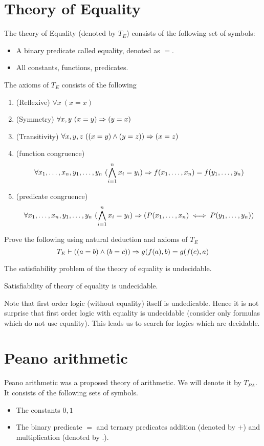 \section{Theory of Equality}
The theory of Equality (denoted by $T_E$) consists of the following set of symbols:
\begin{itemize}
\item A binary predicate called equality, denoted as $=$.
\item All constants, functions, predicates.
\end{itemize}
The axioms of $T_E$ consists of the following
\begin{enumerate}
\item (Reflexive) $\forall x ~(x=x)$
\item (Symmetry) $\forall x,y ~(x=y) \Rightarrow (y=x)$
\item (Transitivity) $\forall x,y,z ~((x=y)\wedge (y=z)) \Rightarrow (x=z)$
\item (function congruence) 
\[\forall x_1,\dots,x_n, y_1,\dots, y_n ~(\bigwedge_{i=1}^n x_i = y_i) \Rightarrow f(x_1,\dots,x_n) = f(y_1,\dots,y_n)\]
\item (predicate congruence) 
\[\forall x_1,\dots,x_n, y_1,\dots, y_n ~(\bigwedge_{i=1}^n x_i = y_i) \Rightarrow (P(x_1,\dots,x_n) \iff P(y_1,\dots,y_n))\]
\end{enumerate}

\begin{exercise}
Prove the following using natural deduction and axioms of $T_E$
\[
T_E \vdash ((a=b) \wedge (b=c)) \Rightarrow g(f(a),b) = g(f(c),a)
\]
\end{exercise}

The satisfiability problem of the theory of equality is undecidable.
\begin{theorem}
Satisfiability of theory of equality is undecidable.
\end{theorem}
Note that first order logic (without equality) itself is undedicable. Hence it is not surprise that first order logic with equality is undecidable (consider only formulas which do not use equality). This leads us to search for logics which are decidable. 

\section{Peano arithmetic}
Peano arithmetic was a proposed theory of arithmetic. We will denote it by $T_{PA}$. It consists of the following sets of symbols.
\begin{itemize}
\item The constants $0,1$
\item The binary predicate $=$ and ternary predicates addition (denoted by $+$) and multiplication (denoted by $.$).
\end{itemize}


